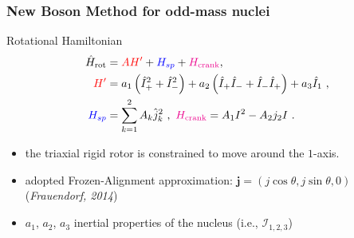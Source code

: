 \documentclass{beamer}
\begin{document}


\begin{frame}
	\frametitle{New Boson Method for odd-mass nuclei}
	\begin{exampleblock}{Rotational Hamiltonian}
		\begin{align}
			\hat{H}_\text{rot}&={\color{red}AH'}+{\color{blue}H_{sp}}+{\color{magenta}H_\text{crank}},\nonumber\\
			{\color{red}H'}&=a_1\left(\hat{I}_+^2+\hat{I}_-^2\right)+a_2\left(\hat{I}_+\hat{I}_-+\hat{I}_-\hat{I}_+\right)+a_3\hat{I}_1\ ,\nonumber\\
			{\color{blue}H_{sp}}&=\sum_{k=1}^2A_k\hat{j}_k^2\ ,\ {\color{magenta}H_\text{crank}}=A_1I^2-A_2j_2I\ .\nonumber
		\end{align}
	\end{exampleblock}
	\begin{itemize}
		\item the triaxial rigid rotor is constrained to move around the $1$-axis.
		\item adopted Frozen-Alignment approximation: $\mathbf{j}=(j\cos\theta,j\sin\theta,0)$ (\textit{Frauendorf, 2014})
		\item $a_1$, $a_2$, $a_3$ inertial properties of the nucleus (i.e., $\mathcal{I}_{1,2,3}$)
	\end{itemize}
\end{frame}
\end{document}
